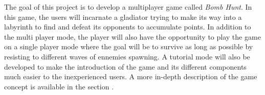 The goal of this project is to develop a multiplayer game called \textit{Bomb Hunt}. In this game, the users will incarnate a gladiator trying to make its way into a labyrinth to find and defeat its opponents to accumulate points. In addition to the multi player mode, the player will also have the opportunity to play the game on a single player mode where the goal will be to survive as long as possible by resisting to different waves of ennemies spawning. A tutorial mode will also be developed to make the introduction of the game and its different components much easier to the inexperienced users. A more in-depth description of the game concept is available in the section .
